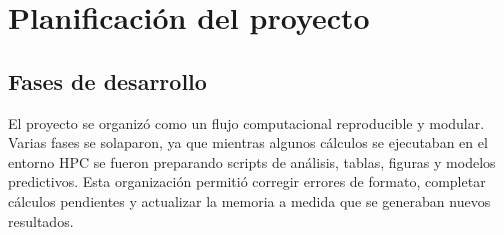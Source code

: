 \documentclass[
  spanish,
  a4paper,
  12pt,
  oneside,
  openany]{memoir}
\newcommand{\apendice}[1]{\chapter{#1}}
\begin{document}
\frontmatter
\tableofcontents
\clearpage
\mainmatter
\pagestyle{plain}
\appendix

\apendice{Planificación del proyecto}

\section{Fases de desarrollo}

El proyecto se organizó como un flujo computacional reproducible y
modular. Varias fases se solaparon, ya que mientras algunos cálculos se
ejecutaban en el entorno HPC se fueron preparando scripts de análisis,
tablas, figuras y modelos predictivos. Esta organización permitió
corregir errores de formato, completar cálculos pendientes y actualizar
la memoria a medida que se generaban nuevos resultados.
\end{document}
